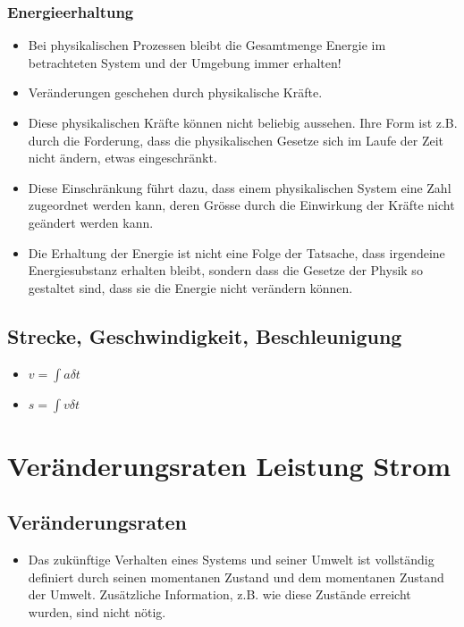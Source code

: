\documentclass[6pt,a4paper]{scrartcl}
\begin{document}
\begin{multicols*}{4}
		\subsubsection{Energieerhaltung}			
			\begin{itemize}\itemsep0pt		
				\item Bei physikalischen Prozessen bleibt die Gesamtmenge Energie im betrachteten System und der Umgebung immer erhalten! 					
				\item Veränderungen geschehen durch physikalische Kräfte. 
				\item Diese physikalischen Kräfte können nicht beliebig aussehen. Ihre Form ist z.B. durch die Forderung, dass die physikalischen Gesetze sich im Laufe der Zeit nicht ändern, etwas eingeschränkt. 
				\item Diese Einschränkung führt dazu, dass einem physikalischen System eine Zahl zugeordnet werden kann, deren Grösse durch die Einwirkung der Kräfte nicht geändert werden kann. 		
				\item Die Erhaltung der Energie ist nicht eine Folge der Tatsache, dass irgendeine Energiesubstanz erhalten bleibt, sondern dass die Gesetze der Physik so gestaltet sind, dass sie die Energie nicht verändern können. 
				
			\end{itemize}

		\subsection{Strecke, Geschwindigkeit, Beschleunigung}
			\begin{itemize}\itemsep0pt				
				\item $v=\int a \delta t$
				\item $s=\int v \delta t$
			\end{itemize}			
			
	\section{Veränderungsraten Leistung Strom}
		\subsection{Veränderungsraten}
			\begin{itemize}\itemsep0pt			
				\item Das zukünftige Verhalten eines Systems und seiner Umwelt ist vollständig definiert durch seinen momentanen Zustand und dem momentanen Zustand der Umwelt. Zusätzliche Information, z.B. wie diese Zustände erreicht wurden, sind nicht nötig.
				

\end{itemize}
\end{multicols*}
\end{document}
